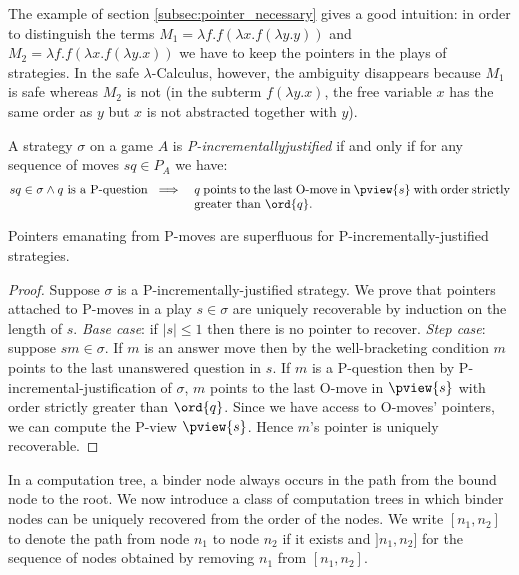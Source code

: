 The example of section \ref{subsec:pointer_necessary} gives a good
intuition: in order to distinguish the terms $M_1 = \lambda f . f
(\lambda x . f (\lambda y .y ))$ and $M_2 = \lambda f . f (\lambda x
. f (\lambda y .x ))$ we have to keep the pointers in the plays of
strategies. In the safe $\lambda$-Calculus, however, the ambiguity disappears because $M_1$ is
safe whereas $M_2$ is not (in the subterm $f (\lambda y . x)$, the
free variable $x$ has the same order as $y$ but $x$ is not
abstracted together with $y$).

\begin{definition}
A strategy $\sigma$ on a game $A$ is
\emph{P-incrementally\-justified} if and only if for any sequence of
moves $s q \in P_A$ we have:
\begin{eqnarray*}
s q \in \sigma \wedge q \mbox{ is a P-question } &\implies&
\parbox[t]{9cm}{$q$  points to the last O-move in $\pview{s}$
with order strictly greater than $\ord{q}$.}
\end{eqnarray*}
\end{definition}

\begin{lemma}
\label{lem:incrjustified_pointers_uniqu_recover} Pointers emanating from P-moves are
superfluous for P-incrementally-justified strategies.
\end{lemma}
\begin{proof}
Suppose $\sigma$ is a P-incrementally-justified strategy. We prove that pointers attached to P-moves in a play $s\in \sigma$ are uniquely recoverable by induction on the length of $s$. \noindent \emph{Base case}: if $|s| \leq 1$ then there is no pointer to recover.
\noindent \emph{Step case}: suppose $s m \in \sigma$. If $m$ is an answer move then by the well-bracketing condition $m$ points
to the last unanswered question in $s$. If $m$ is a P-question then by  P-incremental-justification of $\sigma$, $m$ points to the last O-move in
$\pview{s}$ with order strictly greater than $\ord{q}$. Since we have access to O-moves' pointers, we can compute the P-view $\pview{s}$.
Hence $m$'s pointer is uniquely recoverable.
\end{proof}



In a computation tree, a binder node always occurs in the path from the bound node to the root. We now introduce a class of computation trees in which binder nodes can be uniquely recovered from the order
of the nodes. We write $[n_1,n_2]$ to denote the path from node
$n_1$ to node $n_2$ if it exists and $]n_1,n_2]$ for the sequence of
nodes obtained by removing $n_1$ from $[n_1,n_2]$.

